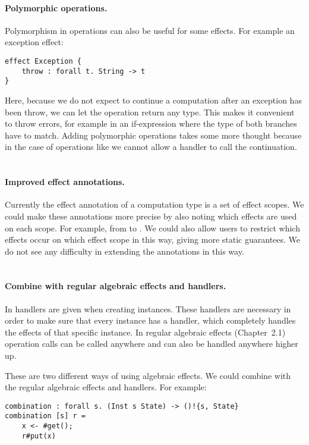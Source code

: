 \paragraph{Polymorphic operations.}
Polymorphism in operations can also be useful for some effects.
For example an exception effect:
\begin{verbatim}
effect Exception {
	throw : forall t. String -> t
}
\end{verbatim}
Here, because we do not expect to continue a computation after an exception has been throw, we can let the  operation return any type.
This makes it convenient to throw errors, for example in an if-expression where the type of both branches have to match.
Adding polymorphic operations takes some more thought because in the case of operations like  we cannot allow a handler to call the continuation.
\\\\
\paragraph{Improved effect annotations.}
Currently the effect annotation of a computation type is a set of effect scopes.
We could make these annotations more precise by also noting which effects are used on each scope.
For example, from  to .
We could also allow users to restrict which effects occur on which effect scope in this way, giving more static guarantees.
We do not see any difficulty in extending the annotations in this way.
\\\\
\paragraph{Combine with regular algebraic effects and handlers.}
In \lang{} handlers are given when creating instances.
These handlers are necessary in order to make sure that every instance has a handler, which completely handles the effects of that specific instance.
In regular algebraic effects (Chapter~2.1) operation calls can be called anywhere and can also be handled anywhere higher up.

These are two different ways of using algebraic effects.
We could combine \lang{} with the regular algebraic effects and handlers.
For example:
\begin{verbatim}
combination : forall s. (Inst s State) -> ()!{s, State}
combination [s] r =
	x <- #get();
	r#put(x)
\end{verbatim}

